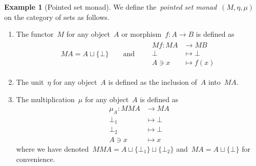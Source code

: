 \documentclass[a4paper]{article}
\theoremstyle{plain}
\theoremstyle{definition}
\newtheorem{example}[theorem]{Example}
\begin{document}
\begin{example}[Pointed set monad]
    \label{monad:maybe}
    We define the~\emph{pointed set monad}~\((M,\eta,\mu)\) on the category of
    sets as follows.
    \begin{enumerate}
        \item The functor~\(M\) for any object~\(A\) or
            morphism~\(f:A\longrightarrow B\) is defined as
            \begin{gather*}
                MA = A\sqcup\{\bot\}
                \qquad\text{and}\qquad
                \begin{split}
                    Mf:MA&\longrightarrow MB \\
                    \bot&\longmapsto\bot \\
                    A\ni x&\longmapsto f(x)
                \end{split}
            \end{gather*}
        \item The unit~\(\eta\) for any object~\(A\) is defined as the inclusion
            of~\(A\) into~\(MA\).
        \item The multiplication~\(\mu\) for any object~\(A\) is defined as
            \begin{align*}
                \mu_{A}:MMA&\longrightarrow MA \\
                \bot_{1}&\longmapsto \bot \\
                \bot_{2}&\longmapsto \bot \\
                A\ni x&\longmapsto x
            \end{align*}
            where we have denoted~\(MMA=A\sqcup\{\bot_{1}\}\sqcup\{\bot_{2}\}\)
            and~\(MA=A\sqcup\{\bot\}\) for convenience.
    \end{enumerate}
\end{example}
\end{document}
